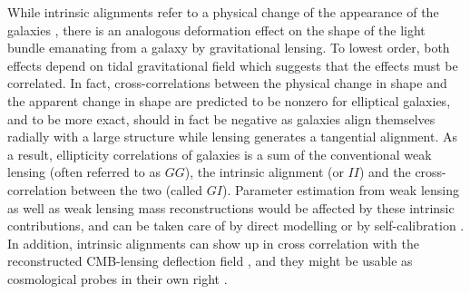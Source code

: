 \documentclass[a4paper,fleqn,usenatbib]{mnras}
\begin{document}
While intrinsic alignments refer to a physical change of the appearance of the galaxies \citep[for reviews, see][]{kiessling_galaxy_2015, joachimi_galaxy_2015, kirk_galaxy_2015, troxel_intrinsic_2015}, there is an analogous deformation effect on the shape of the light bundle emanating from a galaxy by gravitational lensing. To lowest order, both effects depend on tidal gravitational field which suggests that the effects must be correlated. In fact, cross-correlations between the physical change in shape and the apparent change in shape are predicted to be nonzero for elliptical galaxies, and to be more exact, should in fact be negative as galaxies align themselves radially with a large structure while lensing generates a tangential alignment. As a result, ellipticity correlations of galaxies is a sum of the conventional weak lensing (often referred to as $GG$), the intrinsic alignment (or $II$) and the cross-correlation between the two (called $GI$). Parameter estimation from weak lensing \citep{casarini_non-linear_2011, capranico_intrinsic_2013, blazek_beyond_2017} as well as weak lensing mass reconstructions \citep{fan_intrinsic_2007, chang_dark_2017} would be affected by these intrinsic contributions, and can be taken care of by direct modelling or by self-calibration \citep{troxel_self-calibration_2012, yao_effects_2017, yao_self-calibration_2018, yao_separating_2019, pedersen_first_2019}. In addition, intrinsic alignments can show up in cross correlation with the reconstructed CMB-lensing deflection field \citep{hirata_cross-correlation_2004, hall_intrinsic_2014, chisari_contamination_2015, larsen_intrinsic_2016, merkel_imitating_2017}, and they might be usable as cosmological probes in their own right \citep{pandya_can_2019, taruya_improving_2020}.
\end{document}
